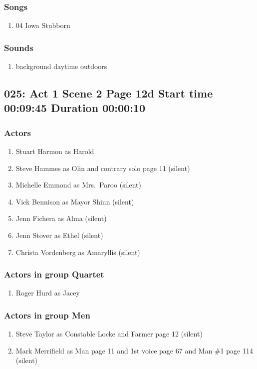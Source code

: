 \subsubsection{Songs}
\begin{enumerate}
\item 04 Iowa Stubborn
\end{enumerate}\subsubsection{Sounds}
\begin{enumerate}
\item background daytime outdoors
\end{enumerate}
\subsection{025: Act 1 Scene 2 Page 12d Start time 00:09:45 Duration 00:00:10}

\subsubsection{Actors}
\begin{enumerate}
\item Stuart Harmon as Harold
\item Steve Hammes as Olin and contrary solo page 11 (silent)
\item Michelle Emmond as Mrs.~Paroo (silent)
\item Vick Bennison as Mayor Shinn (silent)
\item Jenn Fichera as Alma (silent)
\item Jenn Stover as Ethel (silent)
\item Christa Vordenberg as Amaryllis (silent)
\end{enumerate}
\subsubsection{Actors in group Quartet}
\begin{enumerate}
\item Roger Hurd as Jacey
\end{enumerate}
\subsubsection{Actors in group Men}
\begin{enumerate}
\item Steve Taylor as Constable Locke and Farmer page 12 (silent)
\item Mark Merrifield as Man page 11 and 1st voice page 67 and Man \#1 page 114 (silent)
\end{enumerate}
